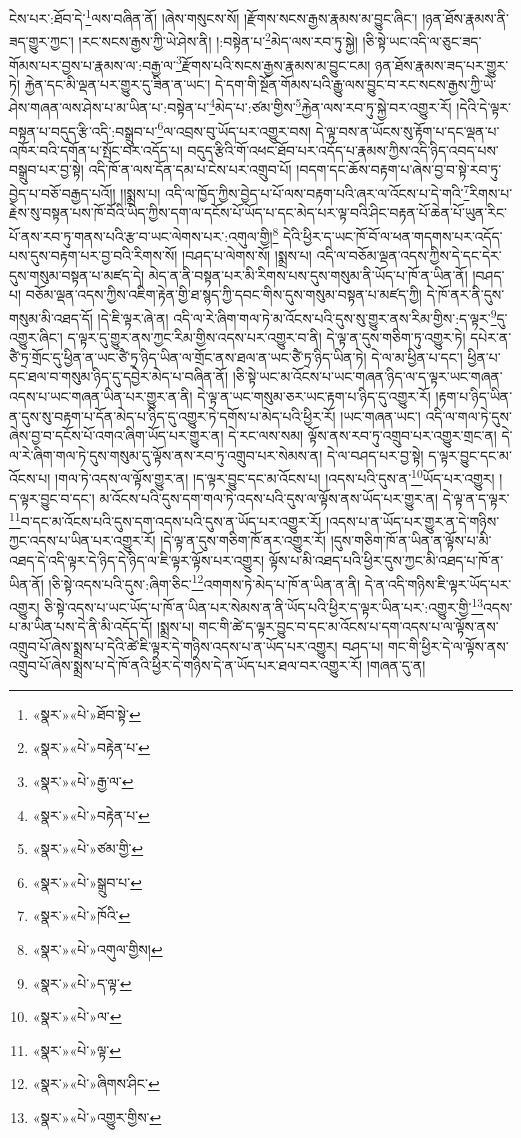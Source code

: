 ངེས་པར་:ཐོབ་དེ་\footnote{«སྣར་»«པེ་»ཐོབ་སྟེ་}ལས་བཞིན་ནོ། །ཞེས་གསུངས་སོ། །རྫོགས་སངས་རྒྱས་རྣམས་མ་བྱུང་ཞིང་། །ཉན་ཐོས་རྣམས་ནི་ཟད་གྱུར་ཀྱང་། །རང་སངས་རྒྱས་ཀྱི་ཡེ་ཤེས་ནི། །:བསྟེན་པ་\footnote{«སྣར་»«པེ་»བརྟེན་པ་}མེད་ལས་རབ་ཏུ་སྐྱེ། །ཅི་སྟེ་ཡང་འདི་ལ་ཅུང་ཟད་གོམས་པར་བྱས་པ་རྣམས་ལ་:བརྒྱ་ལ་\footnote{«སྣར་»«པེ་»རྒྱ་ལ་}རྫོགས་པའི་སངས་རྒྱས་རྣམས་མ་བྱུང་ངམ། ཉན་ཐོས་རྣམས་ཟད་པར་གྱུར་ཏེ། རྐྱེན་དང་མི་ལྡན་པར་གྱུར་དུ་ཟིན་ན་ཡང་། དེ་དག་གི་སྔོན་གོམས་པའི་རྒྱུ་ལས་བྱུང་བ་རང་སངས་རྒྱས་ཀྱི་ཡེ་ཤེས་གཞན་ལས་ཤེས་པ་མ་ཡིན་པ་:བསྟེན་པ་\footnote{«སྣར་»«པེ་»བརྟེན་པ་}མེད་པ་:ཙམ་གྱིས་\footnote{«སྣར་»«པེ་»ཙམ་གྱི་}རྐྱེན་ལས་རབ་ཏུ་སྐྱེ་བར་འགྱུར་རོ། །དེའི་དེ་ལྟར་བསྟན་པ་བདུད་རྩི་འདི་:བསྒྲུབ་པ་\footnote{«སྣར་»«པེ་»སྒྲུབ་པ་}ལ་འབྲས་བུ་ཡོད་པར་འགྱུར་བས། དེ་ལྟ་བས་ན་ཡོངས་སུ་རྟོག་པ་དང་ལྡན་པ་འཁོར་བའི་དགོན་པ་སྤོང་བར་འདོད་པ། བདུད་རྩིའི་གོ་འཕང་ཐོབ་པར་འདོད་པ་རྣམས་ཀྱིས་འདི་ཉིད་འབད་པས་བསྒྲུབ་པར་བྱ་སྟེ། འདི་ཁོ་ན་ལས་དོན་དམ་པ་ངེས་པར་འགྲུབ་པོ། །བདག་དང་ཆོས་བརྟག་པ་ཞེས་བྱ་བ་སྟེ་རབ་ཏུ་བྱེད་པ་བཅོ་བརྒྱད་པའོ།། །།སྨྲས་པ། འདི་ལ་ཁྱོད་ཀྱིས་བྱེད་པ་པོ་ལས་བརྟག་པའི་ཞར་ལ་འོངས་པ་དེ་གའི་\footnote{«སྣར་»«པེ་»ཁོའི་}རིགས་པ་རྗེས་སུ་བསྟན་པས་ཁོ་བོའི་ཡིད་ཀྱིས་དག་ལ་དངོས་པོ་ཡོད་པ་དང་མེད་པར་ལྟ་བའི་ཤིང་བརྟན་པོ་ཆེན་པོ་ཡུན་རིང་པོ་ནས་རབ་ཏུ་གནས་པའི་རྩ་བ་ཡང་ལེགས་པར་:འགུལ་གྱི།\footnote{«སྣར་»«པེ་»འགུལ་གྱིས།} དེའི་ཕྱིར་ད་ཡང་ཁོ་བོ་ལ་ཕན་གདགས་པར་འདོད་པས་དུས་བརྟག་པར་བྱ་བའི་རིགས་སོ། །བཤད་པ་ལེགས་སོ། །སྨྲས་པ། འདི་ལ་བཅོམ་ལྡན་འདས་ཀྱིས་དེ་དང་དེར་དུས་གསུམ་བསྟན་པ་མཛད་དེ། མེད་ན་ནི་བསྟན་པར་མི་རིགས་པས་དུས་གསུམ་ནི་ཡོད་པ་ཁོ་ན་ཡིན་ནོ། །བཤད་པ། བཅོམ་ལྡན་འདས་ཀྱིས་འཇིག་རྟེན་གྱི་ཐ་སྙད་ཀྱི་དབང་གིས་དུས་གསུམ་བསྟན་པ་མཛད་ཀྱི། དེ་ཁོ་ནར་ནི་དུས་གསུམ་མི་འཐད་དོ། །དེ་ཇི་ལྟར་ཞེ་ན། འདི་ལ་རེ་ཞིག་གལ་ཏེ་མ་འོངས་པའི་དུས་སུ་གྱུར་ནས་རིམ་གྱིས་:ད་ལྟར་\footnote{«སྣར་»«པེ་»ད་ལྟ་}དུ་འགྱུར་ཞིང་། ད་ལྟར་དུ་གྱུར་ནས་ཀྱང་རིམ་གྱིས་འདས་པར་འགྱུར་བ་ནི། དེ་ལྟ་ན་དུས་གཅིག་ཏུ་འགྱུར་ཏེ། དཔེར་ན་ཙཻ་ཏྲ་གྲོང་དུ་ཕྱིན་ན་ཡང་ཙཻ་ཏྲ་ཉིད་ཡིན་ལ་གྲོང་ནས་ཐལ་ན་ཡང་ཙཻ་ཏྲ་ཉིད་ཡིན་ཏེ། དེ་ལ་མ་ཕྱིན་པ་དང་། ཕྱིན་པ་དང་ཐལ་བ་གསུམ་ཉིད་དུ་དབྱེར་མེད་པ་བཞིན་ནོ། །ཅི་སྟེ་ཡང་མ་འོངས་པ་ཡང་གཞན་ཉིད་ལ་ད་ལྟར་ཡང་གཞན་འདས་པ་ཡང་གཞན་ཡིན་པར་གྱུར་ན་ནི། དེ་ལྟ་ན་ཡང་གསུམ་ཅར་ཡང་རྟག་པ་ཉིད་དུ་འགྱུར་རོ། །རྟག་པ་ཉིད་ཡིན་ན་དུས་སུ་བརྟག་པ་དོན་མེད་པ་ཉིད་དུ་འགྱུར་ཏེ་དགོས་པ་མེད་པའི་ཕྱིར་རོ། །ཡང་གཞན་ཡང་། འདི་ལ་གལ་ཏེ་དུས་ཞེས་བྱ་བ་དངོས་པོ་འགའ་ཞིག་ཡོད་པར་གྱུར་ན། དེ་རང་ལས་སམ། ལྟོས་ནས་རབ་ཏུ་འགྲུབ་པར་འགྱུར་གྲང་ན། དེ་ལ་རེ་ཞིག་གལ་ཏེ་དུས་གསུམ་དུ་ལྟོས་ནས་རབ་ཏུ་འགྲུབ་པར་སེམས་ན། དེ་ལ་བཤད་པར་བྱ་སྟེ། ད་ལྟར་བྱུང་དང་མ་འོངས་པ། །གལ་ཏེ་འདས་ལ་ལྟོས་གྱུར་ན། །ད་ལྟར་བྱུང་དང་མ་འོངས་པ། །འདས་པའི་དུས་ན་\footnote{«སྣར་»«པེ་»ལ་}ཡོད་པར་འགྱུར། །ད་ལྟར་བྱུང་བ་དང་། མ་འོངས་པའི་དུས་དག་གལ་ཏེ་འདས་པའི་དུས་ལ་ལྟོས་ནས་ཡོད་པར་གྱུར་ན། དེ་ལྟ་ན་ད་ལྟར་\footnote{«སྣར་»«པེ་»ལྟ་}བ་དང་མ་འོངས་པའི་དུས་དག་འདས་པའི་དུས་ན་ཡོད་པར་འགྱུར་རོ། །འདས་པ་ན་ཡོད་པར་གྱུར་ན་དེ་གཉིས་ཀྱང་འདས་པ་ཡིན་པར་འགྱུར་རོ། །དེ་ལྟ་ན་དུས་གཅིག་ཁོ་ནར་འགྱུར་རོ། །དུས་གཅིག་ཁོ་ན་ཡིན་ན་ལྟོས་པ་མི་འཐད་དེ་འདི་ལྟར་དེ་ཉིད་དེ་ཉིད་ལ་ཇི་ལྟར་ལྟོས་པར་འགྱུར། ལྟོས་པ་མི་འཐད་པའི་ཕྱིར་དུས་ཀྱང་མི་འཐད་པ་ཁོ་ན་ཡིན་ནོ། །ཅི་སྟེ་འདས་པའི་དུས་:ཞིག་ཅིང་\footnote{«སྣར་»«པེ་»ཞིགས་ཤིང་}འགགས་ཏེ་མེད་པ་ཁོ་ན་ཡིན་ན་ནི། དེ་ན་འདི་གཉིས་ཇི་ལྟར་ཡོད་པར་འགྱུར། ཅི་སྟེ་འདས་པ་ཡང་ཡོད་པ་ཁོ་ན་ཡིན་པར་སེམས་ན་ནི་ཡོད་པའི་ཕྱིར་ད་ལྟར་ཡིན་པར་:འགྱུར་གྱི་\footnote{«སྣར་»«པེ་»འགྱུར་གྱིས་}འདས་པ་མ་ཡིན་པས་དེ་ནི་མི་འདོད་དོ། །སྨྲས་པ། གང་གི་ཚེ་ད་ལྟར་བྱུང་བ་དང་མ་འོངས་པ་དག་འདས་པ་ལ་ལྟོས་ནས་འགྲུབ་པོ་ཞེས་སྨྲས་པ་དེའི་ཚེ་ཇི་ལྟར་དེ་གཉིས་འདས་པ་ན་ཡོད་པར་འགྱུར། བཤད་པ། གང་གི་ཕྱིར་དེ་ལ་ལྟོས་ནས་འགྲུབ་པོ་ཞེས་སྨྲས་པ་དེ་ཁོ་ནའི་ཕྱིར་དེ་གཉིས་དེ་ན་ཡོད་པར་ཐལ་བར་འགྱུར་རོ། །གཞན་དུ་ན། 